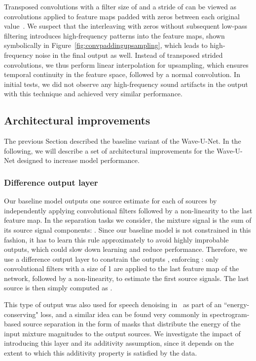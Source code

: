 \documentclass{article}
\begin{document}
Transposed convolutions with a filter size of  and a stride of  can be viewed as convolutions applied to feature maps padded with  zeros between each original value~\cite{Dumoulin2016a}.
We suspect that the interleaving with zeros without subsequent low-pass filtering introduces high-frequency patterns into the feature maps, shown symbolically in Figure~\ref{fig:convpaddingupsampling}, which leads to high-frequency noise in the final output as well.
Instead of transposed strided convolutions, we thus perform linear interpolation for upsampling, which ensures temporal continuity in the feature space, followed by a normal convolution.
In initial tests, we did not observe any high-frequency sound artifacts in the output with this technique and achieved very similar performance.

\subsection{Architectural improvements}
\label{sec:model_improv}

The previous Section described the baseline variant of the Wave-U-Net.
In the following, we will describe a set of architectural improvements for the Wave-U-Net designed to increase model performance.

\subsubsection{Difference output layer}
\label{sec:model_improv_diff}

Our baseline model outputs one source estimate for each of  sources by independently applying  convolutional filters followed by a  non-linearity to the last feature map.
In the separation tasks we consider, the mixture signal is the sum of its source signal components: . 
Since our baseline model is not constrained in this fashion, it has to learn this rule approximately to avoid highly improbable outputs, which could slow down learning and reduce performance.
Therefore, we use a difference output layer to constrain the outputs , enforcing :
only  convolutional filters with a size of 1 are applied to the last feature map of the network, followed by a  non-linearity, to estimate the first  source signals.
The last source is then simply computed as .

This type of output was also used for speech denoising in~\cite{Rethage2017} as part of an ``energy-conserving" loss, and a similar idea can be found very commonly in spectrogram-based source separation in the form of masks that distribute the energy of the input mixture magnitudes to the output sources.
We investigate the impact of introducing this layer and its additivity assumption, since it depends on the extent to which this additivity property is satisfied by the data.
\end{document}

